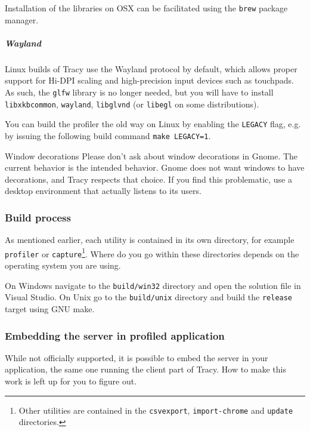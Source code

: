 \documentclass[hidelinks,titlepage,a4paper]{article}
\begin{document}
Installation of the libraries on OSX can be facilitated using the \texttt{brew} package manager.

\subparagraph{Wayland}

Linux builds of Tracy use the Wayland protocol by default, which allows proper support for Hi-DPI scaling and high-precision input devices such as touchpads. As such, the \texttt{glfw} library is no longer needed, but you will have to install \texttt{libxkbcommon}, \texttt{wayland}, \texttt{libglvnd} (or \texttt{libegl} on some distributions).

You can build the profiler the old way on Linux by enabling the \texttt{LEGACY} flag, e.g. by issuing the following build command \texttt{make LEGACY=1}.

\begin{bclogo}[
noborder=true,
couleur=black!5,
logo=\bcbombe
]{Window decorations}
Please don't ask about window decorations in Gnome. The current behavior is the intended behavior. Gnome does not want windows to have decorations, and Tracy respects that choice. If you find this problematic, use a desktop environment that actually listens to its users.
\end{bclogo}

\subsubsection{Build process}

As mentioned earlier, each utility is contained in its own directory, for example \texttt{profiler} or \texttt{capture}\footnote{Other utilities are contained in the \texttt{csvexport}, \texttt{import-chrome} and \texttt{update} directories.}. Where do you go within these directories depends on the operating system you are using.

On Windows navigate to the \texttt{build/win32} directory and open the solution file in Visual Studio. On Unix go to the \texttt{build/unix} directory and build the \texttt{release} target using GNU make.

\subsubsection{Embedding the server in profiled application}
\label{embeddingserver}

While not officially supported, it is possible to embed the server in your application, the same one running the client part of Tracy. How to make this work is left up for you to figure out.
\end{document}
